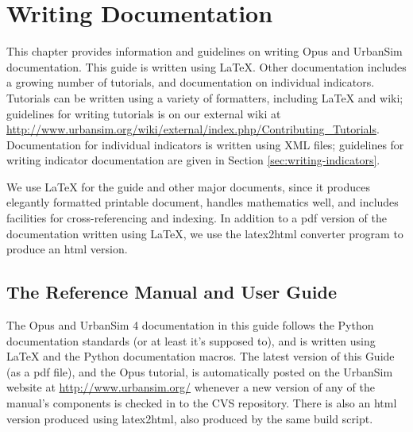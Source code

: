 
\chapter{Writing Documentation}

This chapter provides information and guidelines on writing Opus and
UrbanSim documentation.  This guide is written using \LaTeX{}. \latexindex
Other documentation includes a growing number of tutorials, and documentation on individual
indicators.  Tutorials can be written using a variety of formatters, 
including \LaTeX{} and wiki;
guidelines for writing tutorials is on our external wiki at
\url{http://www.urbansim.org/wiki/external/index.php/Contributing_Tutorials}.
Documentation for individual indicators is written using XML files;
guidelines for writing indicator documentation are given in Section
\ref{sec:writing-indicators}.

We use \LaTeX{} for the guide and other major documents,
since it produces elegantly formatted printable document, handles
mathematics well, and includes facilities for cross-referencing and
indexing.  In addition to a pdf version of the documentation written using
\LaTeX{}, \latexindex we use the latex2html \latexindex 
converter program to produce an html version.

\section{The Reference Manual and User Guide}

The Opus and UrbanSim 4 documentation in this guide follows the Python \pythonindex
documentation standards (or at least it's supposed to), and is written
using \LaTeX{} \latexindex and the Python \pythonindex documentation macros.
The latest version of this Guide (as a pdf file), and the Opus tutorial, is
automatically posted on the UrbanSim website at
\url{http://www.urbansim.org/} whenever a new version of any of the
manual's components is checked in to the CVS \cvsindex repository.  There is also an
html version produced using latex2html, \latexindex also produced by the same build
script.

